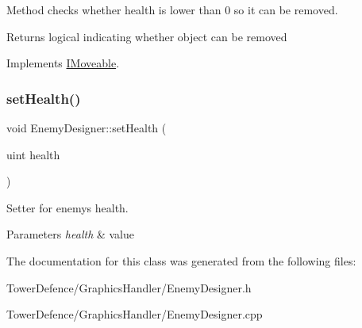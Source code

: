 Method checks whether health is lower than 0 so it can be removed. 

\begin{DoxyReturn}{Returns}
logical indicating whether object can be removed 
\end{DoxyReturn}


Implements \mbox{\hyperlink{class_i_moveable}{I\+Moveable}}.

\mbox{\label{class_enemy_designer_afaed42dca9d945456c780c55a6c16b84}} 
\subsubsection{\texorpdfstring{set\+Health()}{setHealth()}}
{\footnotesize\ttfamily void Enemy\+Designer\+::set\+Health (\begin{DoxyParamCaption}\item[{uint}]{health }\end{DoxyParamCaption})\hspace{0.3cm}{\ttfamily [virtual]}}



Setter for enemy\textquotesingle{}s health. 


\begin{DoxyParams}{Parameters}
{\em health} & value \\
\hline
\end{DoxyParams}


The documentation for this class was generated from the following files\+:\begin{DoxyCompactItemize}
\item 
Tower\+Defence/\+Graphics\+Handler/Enemy\+Designer.\+h\item 
Tower\+Defence/\+Graphics\+Handler/Enemy\+Designer.\+cpp\end{DoxyCompactItemize}
